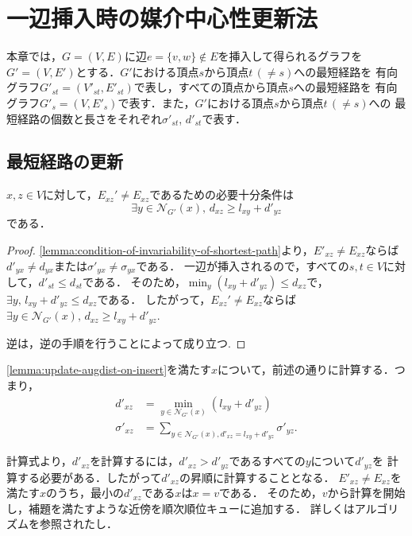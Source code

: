 \section{一辺挿入時の媒介中心性更新法}
\label{sect:update-bc-on-insert}
本章では，$G=(V,E)$に辺$e=\{v,w\} \not\in E$を挿入して得られるグラフを
$G'=(V,E')$とする．$G'$における頂点$s$から頂点$t\,(\neq s)$への最短経路を
有向グラフ$G'_{st}=(V'_{st},E'_{st})$で表し，すべての頂点から頂点$s$への最短経路を
有向グラフ$G'_s=(V,E'_s)$で表す．また，$G'$における頂点$s$から頂点$t\,(\neq s)$への
最短経路の個数と長さをそれぞれ$\sigma'_{st}$, $d'_{st}$で表す．

\subsection{最短経路の更新}
\label{subsect:update-augdist-on-insert}

\begin{lemma}
  \label{lemma:update-augdist-on-insert}
  $x,z\in V$に対して，$E_{xz}'\neq E_{xz}$であるための必要十分条件は
  \[ \exists y\in\mathcal{N}_{G'}(x),\,d_{xz}\geq l_{xy}+d'_{yz} \]
  である．
\end{lemma}
\begin{proof}
  \ref{lemma:condition-of-invariability-of-shortest-path}より，$E'_{xz}\neq E_{xz}$ならば
  $d'_{yx}\neq d_{yx}$または$\sigma'_{yx}\neq\sigma_{yx}$である．
  一辺が挿入されるので，すべての$s,t\in V$に対して，$d'_{st}\leq d_{st}$である．
  そのため，$\min_y(l_{xy}+d'_{yz})\leq d_{xz}$で，$\exists y,\,l_{xy}+d'_{yz}\leq d_{xz}$である．
  したがって，$E_{xz}'\neq E_{xz}$ならば$\exists y\in\mathcal{N}_{G'}(x),\,d_{xz}\geq l_{xy}+d'_{yz}$.

  逆は，逆の手順を行うことによって成り立つ.
\end{proof}

\ref{lemma:update-augdist-on-insert}を満たす$x$について，前述の通りに計算する．つまり，
\begin{align*}
  d'_{xz}&=\min_{y\in\mathcal{N}_{G'}(x)}(l_{xy}+d'_{yz})\\
  \sigma'_{xz}&=\sum_{y\in\mathcal{N}_{G'}(x),d'_{xz}=l_{xy}+d'_{yz}}\sigma'_{yz}.
\end{align*}

計算式より，$d'_{xz}$を計算するには，$d'_{xz}>d'_{yz}$であるすべての$y$について$d'_{yz}$を
計算する必要がある．したがって$d'_{xz}$の昇順に計算することとなる．
$E'_{xz}\neq E_{xz}$を満たす$x$のうち，最小の$d'_{xz}$である$x$は$x=v$である．
そのため，$v$から計算を開始し，補題を満たすような近傍を順次順位キューに追加する．
詳しくはアルゴリズムを参照されたし．

